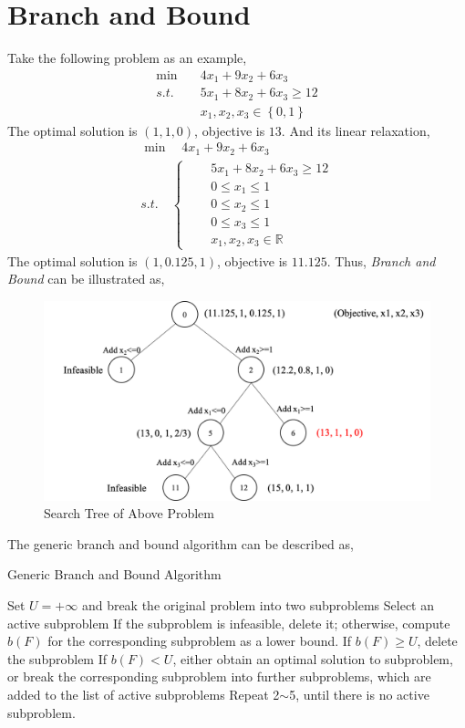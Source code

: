 \documentclass{article}
\begin{document}
\newpage
\section{Branch and Bound}

Take the following problem as an example,
\begin{align}
\min \quad & 4x_1 + 9x_2 + 6x_3 \\
s.t. \quad & 5x_1 + 8x_2 + 6x_3 \geq 12 \\
& x_1, x_2, x_3 \in \left\{0, 1\right\}
\end{align}
The optimal solution is $(1, 1, 0)$, objective is $13$. And its linear relaxation,
\begin{align}
\min \quad  4x_1 + 9x_2 + 6x_3 \qquad\qquad  \\
s.t. \quad \left\{
\begin{aligned}
& \quad 5x_1 + 8x_2 + 6x_3 \geq 12 \\
& \quad 0 \leq x_1 \leq 1 \\
& \quad 0 \leq x_2 \leq 1 \\
& \quad 0 \leq x_3 \leq 1 \\
& \quad x_1, x_2, x_3 \in \mathbb{R}
\end{aligned} \right.
\end{align}
The optimal solution is $(1, 0.125, 1)$, objective is $11.125$. Thus, \textit{Branch and Bound} can be illustrated as,

\begin{figure}[htbp]
	\centering
	\includegraphics[width=0.8\linewidth]{./figure/rn-b-a-c-tree.png}
	\caption{Search Tree of Above Problem}
	\label{fig:bb}
\end{figure}

\noindent The generic branch and bound algorithm can be described as,
\begin{algorithm}[htbp]
	\caption{Generic Branch and Bound Algorithm}
	\label{alg:bb}
	\begin{algorithmic}[1]
		\State Set $U = +\infty$ and break the original problem into two subproblems
		\State Select an active subproblem
		\State If the subproblem is infeasible, delete it; otherwise, compute $b(F)$ for the corresponding subproblem as a lower bound.
		\State If $b(F) \geq U$, delete the subproblem
		\State If $b(F) < U$, either obtain an optimal solution to subproblem, or break the corresponding subproblem into further subproblems, which are added to the list of active subproblems
		\State Repeat 2$\sim$5, until there is no active subproblem.
	\end{algorithmic}  
\end{algorithm} 
\end{document}
